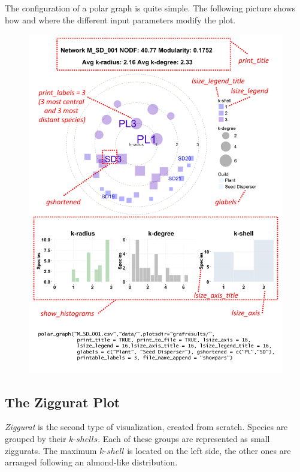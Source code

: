 \documentclass[12pt]{article}
\begin{document}
The configuration of a polar graph is quite simple. The following picture shows how and where the different input parameters modify the plot.

\clearpage
\begin{figure}[ht!]
\centering
\includegraphics[scale=0.75]{polar_params.pdf}
\label{fig:KMAN_polar_params}
\end{figure}

\clearpage

\subsection*{The Ziggurat Plot}
\label{the_ziggurat_plot}

\textit{Ziggurat} is the second type of visualization, created from scratch. Species are grouped by their $k$-$shells$. Each of these groups are represented as small ziggurats. The maximum $k$-$shell$ is located on the left side, the other ones are arranged following an almond-like distribution. 
\end{document}
